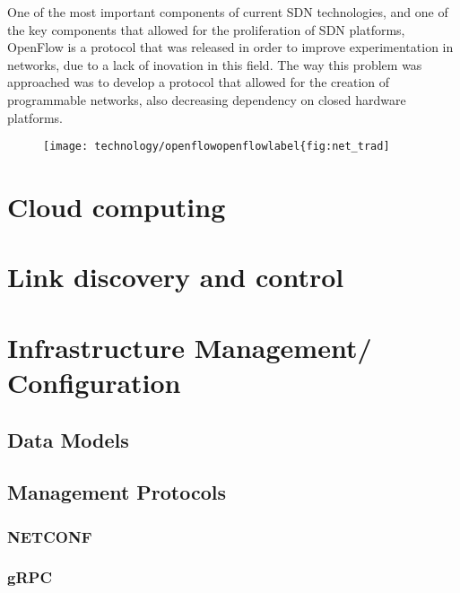 One of the most important components of current SDN technologies, and one of the key components that allowed for the proliferation of SDN platforms, OpenFlow is a protocol that was released in order to improve experimentation
in networks, due to a lack of inovation in this field. The way this problem was approached was to develop a protocol that allowed for the creation of programmable networks, also decreasing dependency on closed hardware platforms.

\begin{figure}[!tbph]
  \centering
  {\texttt{[image: technology/openflowopenflowlabel\{fig:net\_trad]}}
\end{figure}

\section {Cloud computing}
\section {Link discovery and control}
\section {Infrastructure Management/ Configuration}
\subsection {Data Models}
\subsection {Management Protocols}
\subsubsection {NETCONF}
\subsubsection {gRPC}

